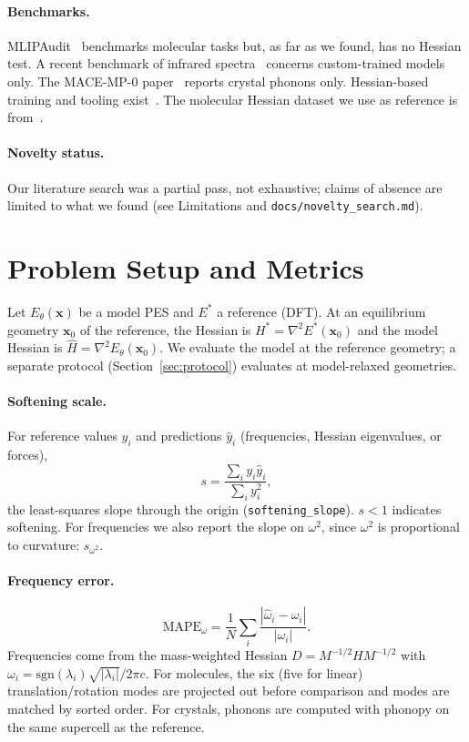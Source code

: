 \documentclass{article}
\newcommand{\sfs}{s}      %
\begin{document}
\paragraph{Benchmarks.} MLIPAudit~\cite{mlipaudit2025} benchmarks molecular tasks but, as far as we found, has no Hessian test. A recent benchmark of infrared spectra~\cite{irbench2026} concerns custom-trained models only. The MACE-MP-0 paper~\cite{batatia2025foundation} reports crystal phonons only. Hessian-based training and tooling exist~\cite{hessiandistill2025}. The molecular Hessian dataset we use as reference is from~\cite{hessianqm9}.

\paragraph{Novelty status.} Our literature search was a partial pass, not exhaustive; claims of absence are limited to what we found (see Limitations and \texttt{docs/novelty\_search.md}).

\section{Problem Setup and Metrics}\label{sec:metrics}
Let $E_\theta(\mathbf{x})$ be a model PES and $E^\ast$ a reference (DFT). At an equilibrium geometry $\mathbf{x}_0$ of the reference, the Hessian is $H^\ast = \nabla^2 E^\ast(\mathbf{x}_0)$ and the model Hessian is $\hat H=\nabla^2 E_\theta(\mathbf{x}_0)$. We evaluate the model at the reference geometry; a separate protocol (Section~\ref{sec:protocol}) evaluates at model-relaxed geometries.

\paragraph{Softening scale.} For reference values $y_i$ and predictions $\hat y_i$ (frequencies, Hessian eigenvalues, or forces), 
\begin{equation}
\sfs=\frac{\sum_i y_i\hat y_i}{\sum_i y_i^2},
\end{equation}
the least-squares slope through the origin (\texttt{softening\_slope}). $\sfs<1$ indicates softening. For frequencies we also report the slope on $\omega^2$, since $\omega^2$ is proportional to curvature: $\sfs_{\omega^2}$.

\paragraph{Frequency error.} 
\begin{equation}
\mathrm{MAPE}_\omega=\frac1N\sum_i\frac{|\hat\omega_i-\omega_i|}{|\omega_i|}.
\end{equation}
Frequencies come from the mass-weighted Hessian $D=M^{-1/2}HM^{-1/2}$ with $\omega_i=\mathrm{sgn}(\lambda_i)\sqrt{|\lambda_i|}/2\pi c$. For molecules, the six (five for linear) translation/rotation modes are projected out before comparison and modes are matched by sorted order. For crystals, phonons are computed with phonopy on the same supercell as the reference.
\end{document}
